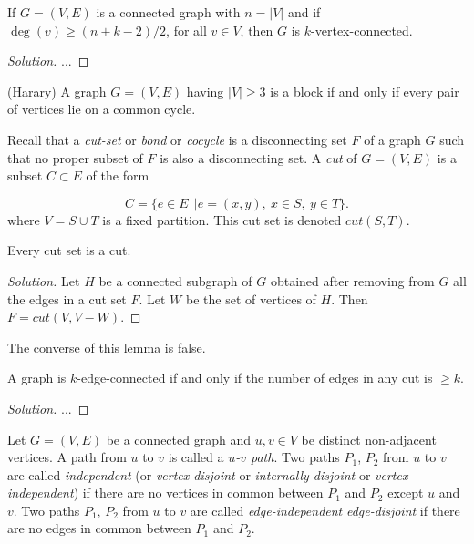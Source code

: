 \begin{theorem}
{\rm
If $G=(V,E)$ is a connected graph with $n=|V|$ and if
$\deg(v)\geq (n+k-2)/2$, for all $v\in V$, then
$G$ is $k$-vertex-connected.
}
\end{theorem}

\begin{proof}[Solution]

...

\end{proof}


\begin{corollary} (Harary)
{\rm
A graph $G=(V,E)$ having $|V|\geq 3$ is a block if and only if
every pair of vertices lie on a common
cycle.
}
\end{corollary}


Recall that a {\it cut-set} or {\it bond}
or {\it cocycle} is a disconnecting set $F$ of a graph $G$ such that
no proper subset of $F$ is also a disconnecting set.
A {\it cut} of $G=(V,E)$ is a subset $C\subset E$ of the form

\[
C=\{e\in E\ \ | e=(x,y), \ x\in S,\ y\in T\}.
\]
where $V=S\cup T$ is a fixed partition.
This cut set is denoted $cut(S,T)$.

\begin{lemma}
{\rm
Every cut set is a cut.
}
\end{lemma}

\begin{proof}[Solution]
Let $H$ be a connected subgraph of $G$ obtained after removing from
$G$ all the edges in a cut set $F$. Let $W$ be the set of vertices
of $H$. Then $F=cut(V,V-W)$.
\end{proof}

The converse of this lemma is false.

\begin{theorem}
{\rm
A graph is $k$-edge-connected if and only if the number of
edges in any cut is $\geq k$.
}
\end{theorem}

\begin{proof}[Solution]

...

\end{proof}


Let $G=(V,E)$ be a connected graph and $u,v\in V$ be distinct non-adjacent
vertices. A path from $u$ to $v$ is called a
{\it $u$-$v$ path}.
Two paths $P_1$, $P_2$ from $u$ to $v$ are called {\it independent}
(or {\it vertex-disjoint} or {\it internally disjoint} or
{\it vertex-independent}) if there are no vertices
in common between $P_1$ and $P_2$ except $u$ and $v$.
Two paths $P_1$, $P_2$ from $u$ to $v$ are called
{\it edge-independent}
{\it edge-disjoint}
if there are no edges
in common between $P_1$ and $P_2$.


